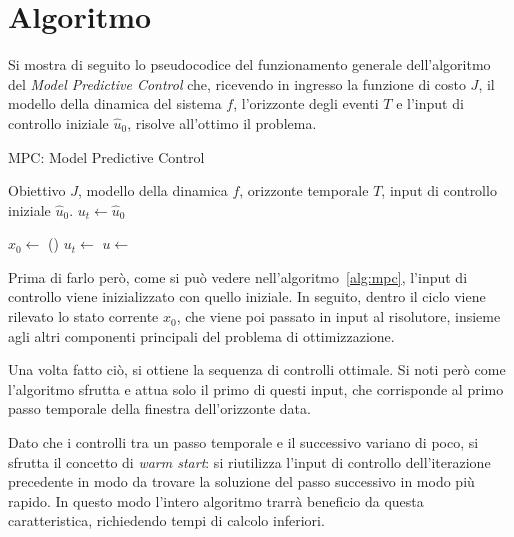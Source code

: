 \section{Algoritmo}
Si mostra di seguito lo pseudocodice del funzionamento generale dell'algoritmo del 
\textit{Model Predictive Control} che, ricevendo in ingresso la funzione di costo $J$, il modello 
della dinamica del sistema $f$, l'orizzonte degli eventi $T$ e l'input di controllo iniziale
$\hat{u}_0$, risolve all'ottimo il problema.
\begin{algorithm}[H]
\caption{MPC: Model Predictive Control}\label{alg:mpc}
\begin{algorithmic}[1]
\Require Obiettivo $J$, modello della dinamica $f$, orizzonte temporale $T$,
input di controllo iniziale $\hat{u}_0$.
\State $u_t \gets \hat{u}_0$

    \State $x_{0} \gets$ ()
    \State $u_t \gets$ 
    \State $u \gets$ 
    \State {}
\EndWhile
\end{algorithmic}
\end{algorithm}
Prima di farlo però, come si può vedere nell'algoritmo~\ref{alg:mpc}, l'input di controllo viene inizializzato con quello iniziale. In 
seguito, dentro il ciclo viene rilevato lo stato corrente $x_0$, che viene poi passato in input al 
risolutore, insieme agli altri componenti principali del problema di ottimizzazione.

Una volta fatto ciò, si ottiene la sequenza di controlli ottimale. Si noti però come l'algoritmo
sfrutta e attua solo il primo di questi input, che corrisponde al primo passo temporale della 
finestra dell'orizzonte data.

Dato che i controlli tra un passo temporale e il successivo variano di poco, si sfrutta il
concetto di \textit{warm start}: si riutilizza l'input di controllo dell'iterazione precedente in 
modo da trovare la soluzione del passo successivo in modo più rapido. In questo modo l'intero 
algoritmo trarrà beneficio da questa caratteristica, richiedendo tempi di calcolo inferiori.

